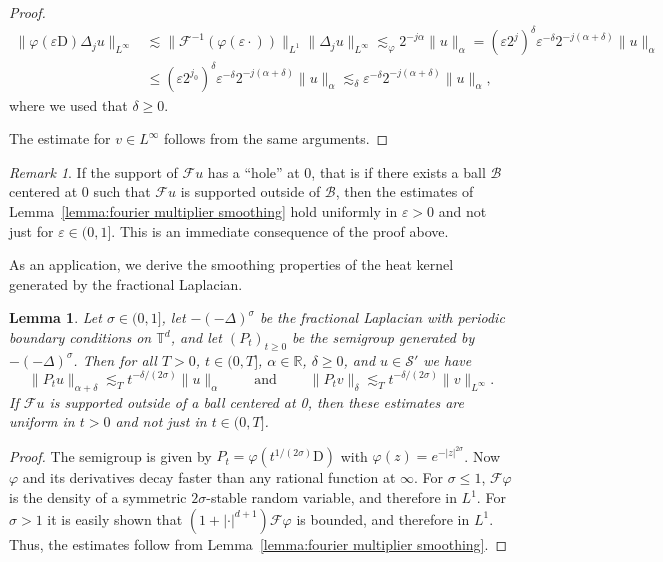 \documentclass[11pt,a4paper]{article}
\newcommand{\cdummy}{\cdot}
\newcommand{\mathD}{\mathrm{D}}
\newcommand{\nosymbol}{}
\newcommand{\tmop}[1]{\ensuremath{\operatorname{#1}}}
\newtheorem{lemma}[theorem]{Lemma}
\theoremstyle{remark}
\newtheorem{remark}[theorem]{Remark}
\newcommand{\R}{\mathbb{R}}
\newcommand{\CB}{\ensuremath{\mathscr{B}}}
\newcommand{\CF}{\ensuremath{\mathscr{F}}}
\newcommand{\CS}{\ensuremath{\mathscr{S}}}
\begin{document}
\begin{proof}
  \begin{align*}
     \| \varphi ( \varepsilon \mathD ) \Delta_{j} u \|_{L^{\infty}} &\lesssim \| \CF^{-1} ( \varphi ( \varepsilon \cdummy ) ) \|_{L^{1}} \| \Delta_{j} u \|_{L^{\infty}} \lesssim_\varphi 2^{-j \alpha} \| u \|_{\alpha} = ( \varepsilon 2^{j} )^{\delta} \varepsilon^{- \delta} 2^{-j ( \alpha +  \delta )} \| u \|_{\alpha} \\
     & \leqslant ( \varepsilon 2^{j_{0}} )^{\delta} \varepsilon^{- \delta} 2^{-j ( \alpha + \delta )} \| u \|_{\alpha} \lesssim_{\delta } \varepsilon^{- \delta} 2^{-j ( \alpha + \delta )} \| u \|_{\alpha},
  \end{align*}
  where we used that $\delta \geqslant 0$.
  
  The estimate for $v \in L^{\infty}$ follows from the same arguments.
\end{proof}

\begin{remark}
   If the support of $\CF u$ has a ``hole'' at 0, that is if there exists a ball $\CB$ centered at 0 such that $\CF u$ is supported outside of $\CB$, then the estimates of Lemma~\ref{lemma:fourier multiplier smoothing} hold uniformly in $\varepsilon > 0$ and not just for $\varepsilon \in (0,1]$. This is an immediate consequence of the proof above.
\end{remark}

As an application, we derive the smoothing properties of the heat kernel generated by the fractional Laplacian.

\begin{lemma}\label{lemma:heat flow smoothing}
   Let $\sigma \in ( 0,1 ]$, let $- ( - \Delta )^{\sigma}$ be the fractional Laplacian with periodic boundary conditions on $\mathbb{T}^{d} \nosymbol$, and let $( P_{t} )_{t \geqslant 0}$ be the semigroup generated by $- ( - \Delta )^{\sigma}$. Then for all $T>0$, $t \in (0,T]$, $\alpha \in \R$, $\delta \geqslant 0$, and $u \in \CS'$ we have
  \[
     \|P_{t} u\|_{\alpha + \delta} \lesssim_T t^{- \delta / ( 2 \sigma )} \|u\|_{\alpha} \hspace{2em} \tmop{and} \hspace{2em} \| P_{t} v \|_{\delta} \lesssim_T t^{- \delta / ( 2 \sigma )} \| v \|_{L^{\infty}} .
  \]
  If $\CF u$ is supported outside of a ball centered at 0, then these estimates are uniform in $t > 0$ and not just in $t \in (0,T]$.
\end{lemma}

\begin{proof}
  The semigroup is given by $P_{t} = \varphi ( t^{1/ ( 2 \sigma )} \mathD )$ with $\varphi ( z ) =e^{- | z |^{2 \sigma}}$. Now $\varphi$ and its derivatives decay faster than any rational function at $\infty$. For $\sigma \leqslant 1$, $\CF \varphi$ is the density of a symmetric $2 \sigma$-stable random variable, and therefore in $L^{1}$. For $\sigma > 1$ it is easily shown that $(1+|\cdot|^{d+1}) \CF \varphi$ is bounded, and therefore in $L^1$. Thus, the estimates follow from Lemma~\ref{lemma:fourier multiplier smoothing}.
\end{proof}
\end{document}
